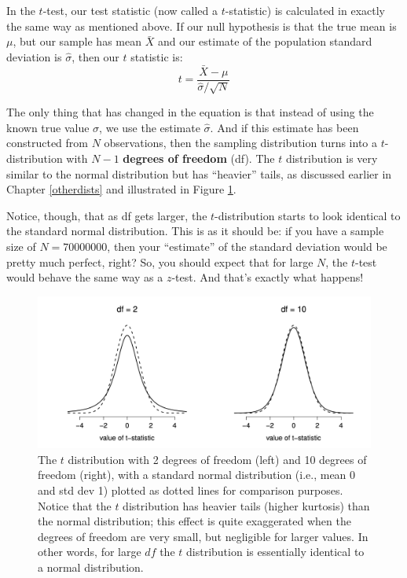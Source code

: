 \documentclass[
]{book}
\theoremstyle{definition}
\theoremstyle{definition}
\theoremstyle{definition}
\theoremstyle{definition}
\theoremstyle{remark}
\begin{document}
In the \(t\)-test, our test statistic (now called a \(t\)-statistic) is calculated in exactly the same way as mentioned above. If our null hypothesis is that the true mean is \(\mu\), but our sample has mean \(\bar{X}\) and our estimate of the population standard deviation is \(\hat{\sigma}\), then our \(t\) statistic is:
\[
t = \frac{\bar{X} - \mu}{\hat{\sigma}/\sqrt{N} }
\]

The only thing that has changed in the equation is that instead of using the known true value \(\sigma\), we use the estimate \(\hat{\sigma}\). And if this estimate has been constructed from \(N\) observations, then the sampling distribution turns into a \(t\)-distribution with \(N-1\) \textbf{degrees of freedom} (df). The \(t\) distribution is very similar to the normal distribution but has ``heavier'' tails, as discussed earlier in Chapter \ref{otherdists} and illustrated in Figure \ref{fig:ttestdist}.

Notice, though, that as df gets larger, the \(t\)-distribution starts to look identical to the standard normal distribution. This is as it should be: if you have a sample size of \(N = 70000000\), then your ``estimate'' of the standard deviation would be pretty much perfect, right? So, you should expect that for large \(N\), the \(t\)-test would behave the same way as a \(z\)-test. And that's exactly what happens!

\begin{figure}

{\centering \includegraphics[width=0.66\linewidth]{resources/image/ttestdist} 

}

\caption{The $t$ distribution with 2 degrees of freedom (left) and 10 degrees of freedom (right), with a standard normal distribution (i.e., mean 0 and std dev 1) plotted as dotted lines for comparison purposes. Notice that the $t$ distribution has heavier tails (higher kurtosis) than the normal distribution; this effect is quite exaggerated when the degrees of freedom are very small, but negligible for larger values. In other words, for large $df$ the $t$ distribution is essentially identical to a normal distribution.}\label{fig:ttestdist}
\end{figure}
\end{document}
